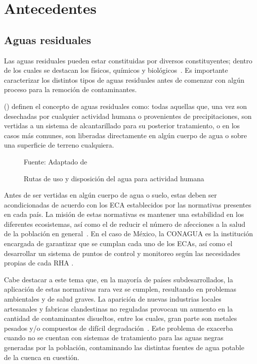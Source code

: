 \section{Antecedentes}
\subsection{Aguas residuales}
Las aguas residuales pueden estar constituidas por diversos constituyentes; dentro de los cuales se destacan los físicos, químicos y biológicos~\citep{crites2000}. Es importante caracterizar los distintos tipos de aguas residuales antes de comenzar con algún proceso para la remoción de contaminantes.\par
\citeauthor{metcalf2003} (\citeyear{metcalf2003}) definen el concepto de aguas residuales como: todas aquellas que, una vez son desechadas por cualquier actividad humana o provenientes de precipitaciones, son vertidas a un sistema de alcantarillado para su posterior tratamiento, o en los casos más comunes, son liberadas directamente en algún cuerpo de agua o sobre una superficie de terreno cualquiera.\par
\begin{figure}[H]
	\centering
	\small{Fuente: Adaptado de }
	\caption{Rutas de uso y disposición del agua para actividad humana}
\end{figure}
Antes de ser vertidas en algún cuerpo de agua o suelo, estas deben ser acondicionadas de acuerdo con los \gls{ECA} establecidos por las normativas presentes en cada país. La misión de estas normativas es mantener una estabilidad en los diferentes ecosistemas, así como el de reducir el número de afecciones a la salud de la población en general~\citep{lazcano2016,martinez1999}. En el caso de México, la \gls{CONAGUA} es la institución encargada de garantizar que se cumplan cada uno de los \acrshort{ECA}s, así como el desarrollar un sistema de puntos de control y monitoreo según las necesidades propias de cada \gls{RHA} \citep{Ortiz2013}. \par
Cabe destacar a este tema que, en la mayoría de países subdesarrollados, la aplicación de estas normativas rara vez se cumplen, resultando en problemas ambientales y de salud graves. La aparición de nuevas industrias locales artesanales y fabricas clandestinas no reguladas provocan un aumento en la cantidad de contaminantes disueltos, entre los cuales, gran parte son metales pesados y/o compuestos de difícil degradación~\cite{metcalf2003}.
Este problema de exacerba cuando no se cuentan con sistemas de tratamiento para las aguas negras generadas por la población, contaminando las distintas fuentes de agua potable de la cuenca en cuestión.\par
